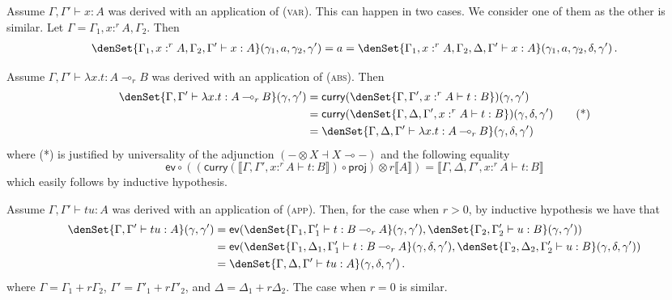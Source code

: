 \documentclass[a4paper,UKenglish,cleveref, autoref, thm-restate]{lipics-v2021}
\newcommand{\lol}{\mathbin{\multimap}}
\newcommand{\mprod}{\otimes}
\newcommand{\mexp}{\lol}
\newcommand{\proj}{\mathsf{proj}}
\newcommand{\ts}{\vdash}
\newcommand{\hastype}[3]{#1\ts #2 : #3}
\newcommand{\curry}{\mathsf{curry}}
\newcommand{\eval}{\mathsf{ev}}
\newcommand{\den}[1]{\llbracket #1\rrbracket}
\begin{document}
\begin{description}[font=\sc,wide]
\item[Case (var):] Assume $\hastype{\Gamma,\Gamma'}{x}{A}$ was derived with an application of (\textsc{var}). This can happen in two cases. We consider one of them as the other is similar. Let $\Gamma = \Gamma_1,x:^r A,\Gamma_2$. Then
\begin{align*}
\denSet{\hastype{\Gamma_1,x:^r A,\Gamma_2,\Gamma'}xA}(\gamma_1,a,\gamma_2,\gamma') 
= a
= \denSet{\hastype{\Gamma_1,x:^r A,\Gamma_2,\Delta,\Gamma'}xA}(\gamma_1,a,\gamma_2,\delta,\gamma')\,.
\end{align*}

\item[Case (abs):] Assume $\hastype{\Gamma,\Gamma'}{\lambda x. t}{A \lol_r B}$ was derived with an application of (\textsc{abs}). 
Then
\begin{align*}
\denSet{\hastype{\Gamma,\Gamma'}{\lambda x. t}{A \lol_r B}}(\gamma,\gamma')
&= \curry(\denSet{\hastype{\Gamma,\Gamma',x:^rA}{t}{B}})(\gamma,\gamma') \\
&= \curry(\denSet{\hastype{\Gamma,\Delta,\Gamma',x:^rA}{t}{B}})(\gamma,\delta,\gamma')
    \tag{*} \\
&= \denSet{\hastype{\Gamma,\Delta,\Gamma'}{\lambda x. t}{A \lol_r B}}(\gamma,\delta,\gamma')
\end{align*}
where (*) is justified by universality of the adjunction $(-\mprod X \dashv X \mexp -)$ and the following equality 
\begin{equation*}
\eval \circ ((\curry(\den{\hastype{\Gamma,\Gamma',x:^rA}{t}{B}}) \circ \proj) \mprod r\den A)
= \den{\hastype{\Gamma,\Delta,\Gamma',x:^rA}{t}{B}}
\end{equation*}
which easily follows by inductive hypothesis.

\item[Case (app):] Assume $\hastype{\Gamma,\Gamma'}{tu}{A}$ was derived with an application of (\textsc{app}). Then, for the case when $r>0$, by inductive hypothesis we have that
\begin{align*}
\denSet{\hastype{\Gamma,\Gamma'}{tu}{A}}(\gamma,\gamma')
&= \eval( \denSet{\hastype{\Gamma_1,\Gamma'_1}{t}{B \lol_r A}}(\gamma,\gamma') , 
         \denSet{\hastype{\Gamma_2,\Gamma'_2}{u}{B}}(\gamma,\gamma') ) \\
&= \eval( \denSet{\hastype{\Gamma_1,\Delta_1,\Gamma'_1}{t}{B \lol_r A}}(\gamma,\delta,\gamma') , 
         \denSet{\hastype{\Gamma_2,\Delta_2,\Gamma'_2}{u}{B}}(\gamma,\delta,\gamma') ) \\
&= \denSet{\hastype{\Gamma,\Delta,\Gamma'}{tu}{A}}(\gamma,\delta,\gamma') \,.
\end{align*}
where $\Gamma = \Gamma_1+r\Gamma_2$, $\Gamma' = \Gamma'_1+r\Gamma'_2$, and $\Delta = \Delta_1 +r\Delta_2$. The case when $r=0$ is similar.


\end{description}
\end{document}
